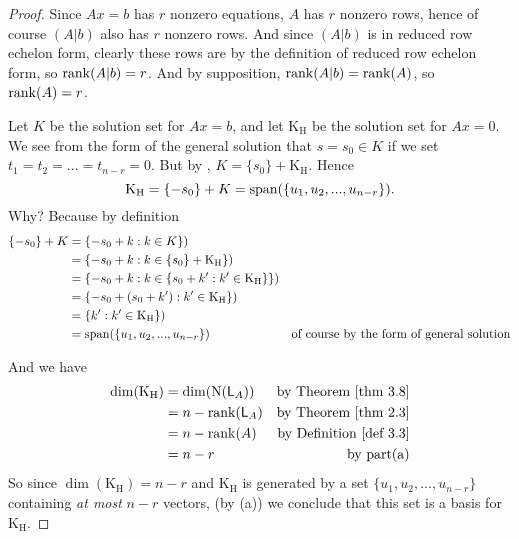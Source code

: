 \begin{proof}
Since \(Ax = b\) has \(r\) nonzero equations, \(A\) has \(r\) nonzero rows, hence of course \((A|b)\) also has \(r\) nonzero rows.
And since \((A|b)\) is in reduced row echelon form, clearly these rows are \emph{\LID{}} by the definition of reduced row echelon form, so \(\mathrm{rank}(A|b) = r\).
And by supposition, \(\mathrm{rank}(A|b) = \mathrm{rank}(A)\), so \(\mathrm{rank}(A) = r\).

Let \(K\) be the solution set for \(Ax = b\), and let \(\mathrm{K_H}\) be the solution set for \(Ax = 0\).
We see from the form of the general solution that \(s = s_0 \in K\) if we set \(t_1 = t_2 = ... = t_{n - r} = 0\).
But by , \(K = \{ s_0 \} + \mathrm{K_H}\).
Hence
\[
    \mathrm{K_H} = \{ -s_0 \} + K = \operatorname{span}(\{ u_1, u_2, ..., u_{n-r}\}).
\]
Why? Because by definition
\begin{align*}
    \{ -s_0 \} + K & = \{ -s_0 + k : k \in K \}) \\
                   & = \{ -s_0 + k : k \in \{ s_0 \} + \mathrm{K_H} \}) \\
                   & = \{ -s_0 + k : k \in \{ s_0 + k' : k' \in \mathrm{K_H} \} \}) \\
                   & = \{ -s_0 + (s_0 + k') : k' \in \mathrm{K_H} \}) \\
                   & = \{ k' : k' \in \mathrm{K_H} \}) \\
                   & = \operatorname{span}(\{ u_1, u_2, ..., u_{n-r}\}) & \text{of course by the form of general solution}
\end{align*}

And we have
\begin{align*}
    \dim(\mathrm{K_H}) & = \dim(\NULL(\LMTRAN_A)) & \text{by \THM{3.8}} \\
                       & = n - \rank(\LMTRAN_A) & \text{by \THM{2.3}} \\
                       & = n - \rank(A) & \text{by \DEF{3.3}} \\
                       & = n - r & \text{by part(a)}
\end{align*}
So since \(\dim(\mathrm{K_H}) = n - r\) and \(\mathrm{K_H}\) is generated by a set \(\{ u_1, u_2, ..., u_{n - r} \}\) containing \emph{at most} \(n - r\) vectors, (by (a)) we conclude that this set is a basis for \(\mathrm{K_H}\).
\end{proof}

